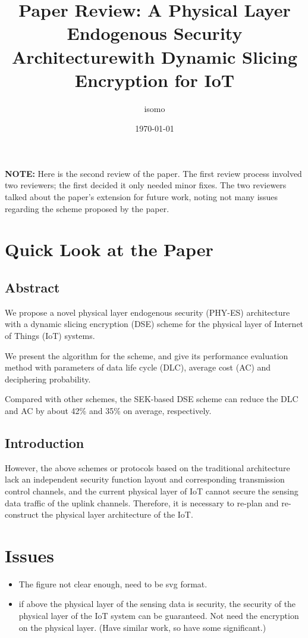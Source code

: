 \documentclass[a4paper]{article}
\title{Paper Review: A Physical Layer Endogenous Security Architecturewith Dynamic Slicing Encryption for IoT}
\author{isomo}
\date{\today}
\begin{document}
\maketitle

\textbf{NOTE:} Here is the second review of the paper. The first review process involved two reviewers; the first decided it only needed minor fixes. The two reviewers talked about the paper's extension for future work, noting not many issues regarding the scheme proposed by the paper.

\section{Quick Look at the Paper}
\subsection{Abstract}

We propose a novel physical layer endogenous security (PHY-ES) architecture with a dynamic slicing encryption (DSE) scheme for the physical layer of Internet of Things (IoT) systems.

We present the algorithm for the scheme, and give its performance evaluation method with parameters of data life cycle (DLC), average cost (AC) and deciphering probability.

Compared with other schemes, the SEK-based DSE scheme can reduce the DLC and AC by about 42\% and 35\% on average, respectively.

\subsection{Introduction}

However, the above schemes or protocols based on the traditional architecture lack an independent security function layout and corresponding transmission control channels, and the current physical layer of IoT cannot secure the sensing data traffic of the uplink channels. Therefore, it is necessary to re-plan and re-construct the physical layer architecture of the IoT.

\section{Issues}

\begin{itemize}
  \item The figure not clear enough, need to be svg format.
  \item if above the physical layer of the sensing data is security, the security of the physical layer of the IoT system can be guaranteed. Not need the encryption on the physical layer. (Have similar work, so have some significant.)
\end{itemize}

% 
\end{document}
